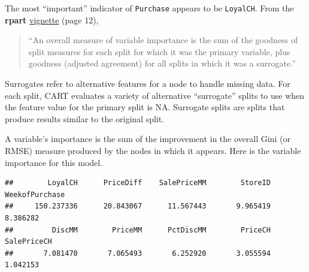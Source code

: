 \documentclass[]{book}
\newenvironment{Shaded}{\begin{snugshade}}{\end{snugshade}}
\newcommand{\NormalTok}[1]{#1}
\newcommand{\OperatorTok}[1]{\textcolor[rgb]{0.81,0.36,0.00}{\textbf{#1}}}
\begin{document}
The most ``important'' indicator of \texttt{Purchase} appears to be \texttt{LoyalCH}. From the \textbf{rpart} \href{https://cran.r-project.org/web/packages/rpart/vignettes/longintro.pdf}{vignette} (page 12),

\begin{quote}
``An overall measure of variable importance is the sum of the goodness of split measures for each split for which it was the primary variable, plus goodness (adjusted agreement) for all splits in which it was a surrogate.''
\end{quote}

Surrogates refer to alternative features for a node to handle missing data. For each split, CART evaluates a variety of alternative ``surrogate'' splits to use when the feature value for the primary split is NA. Surrogate splits are splits that produce results similar to the original split.

A variable's importance is the sum of the improvement in the overall Gini (or RMSE) measure produced by the nodes in which it appears. Here is the variable importance for this model.

\begin{Shaded}
\end{Shaded}

\begin{verbatim}
##        LoyalCH      PriceDiff    SalePriceMM        StoreID WeekofPurchase 
##     150.237336      20.843067      11.567443       9.965419       8.386282 
##         DiscMM        PriceMM      PctDiscMM        PriceCH    SalePriceCH 
##       7.081470       7.065493       6.252920       3.055594       1.042153
\end{verbatim}
\end{document}
